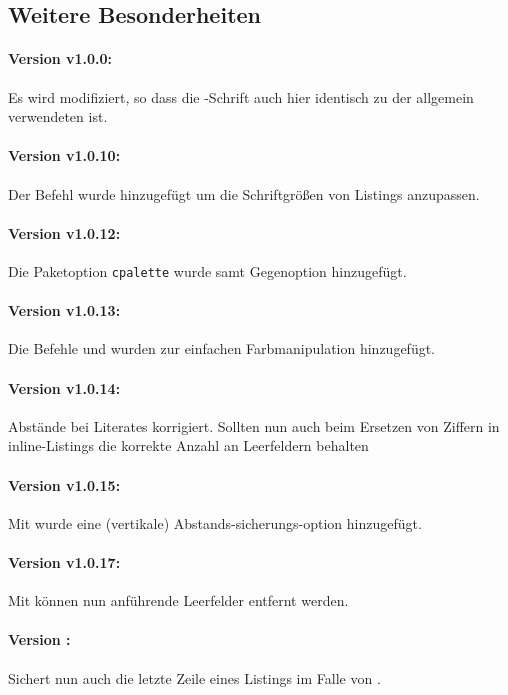 \documentclass{sopra-base}
\begin{document}
\subsection{Weitere Besonderheiten}
\paragraph{Version v1.0.0:} Es wird  modifiziert, so dass die -Schrift auch hier identisch zu der allgemein verwendeten ist.
\paragraph{Version v1.0.10:} Der Befehl  wurde hinzugefügt um die
Schriftgrößen von Listings anzupassen.
\paragraph{Version v1.0.12:} Die Paketoption \texttt{cpalette} wurde samt Gegenoption hinzugefügt.
\paragraph{Version v1.0.13:} Die Befehle  und  wurden zur einfachen Farbmanipulation hinzugefügt.
\paragraph{Version v1.0.14:} Abstände bei Literates korrigiert. Sollten nun auch beim Ersetzen von Ziffern in inline-Listings die korrekte Anzahl an Leerfeldern behalten
\paragraph{Version v1.0.15:} Mit  wurde eine (vertikale) Abstands-sicherungs-option hinzugefügt.
\paragraph{Version v1.0.17:} Mit  können nun anführende Leerfelder entfernt werden.
\paragraph{Version \thesolversion:}
Sichert nun auch die letzte Zeile eines Listings im Falle von .
\end{document}
